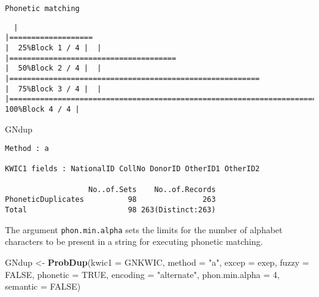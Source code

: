 \documentclass[
]{article}
\newenvironment{Shaded}{\begin{snugshade}}{\end{snugshade}}
\newcommand{\DataTypeTok}[1]{\textcolor[rgb]{0.13,0.29,0.53}{#1}}
\newcommand{\DecValTok}[1]{\textcolor[rgb]{0.00,0.00,0.81}{#1}}
\newcommand{\KeywordTok}[1]{\textcolor[rgb]{0.13,0.29,0.53}{\textbf{#1}}}
\newcommand{\NormalTok}[1]{#1}
\newcommand{\OtherTok}[1]{\textcolor[rgb]{0.56,0.35,0.01}{#1}}
\newcommand{\StringTok}[1]{\textcolor[rgb]{0.31,0.60,0.02}{#1}}
\begin{document}
\begin{verbatim}
Phonetic matching
\end{verbatim}

\begin{verbatim}
  |                                                                                    |===================                                                         |  25%Block 1 / 4 |  |                                                                                    |======================================                                      |  50%Block 2 / 4 |  |                                                                                    |=========================================================                   |  75%Block 3 / 4 |  |                                                                                    |============================================================================| 100%Block 4 / 4 |
\end{verbatim}

\begin{Shaded}
\begin{Highlighting}[]
\NormalTok{GNdup}
\end{Highlighting}
\end{Shaded}

\begin{verbatim}
Method : a

KWIC1 fields : NationalID CollNo DonorID OtherID1 OtherID2
 
                   No..of.Sets    No..of.Records
PhoneticDuplicates          98               263
Total                       98 263(Distinct:263)
\end{verbatim}

The argument \texttt{phon.min.alpha} sets the limits for the number of
alphabet characters to be present in a string for executing phonetic
matching.

\begin{Shaded}
\begin{Highlighting}[]
\NormalTok{GNdup <-}\StringTok{ }\KeywordTok{ProbDup}\NormalTok{(}\DataTypeTok{kwic1 =}\NormalTok{ GNKWIC, }\DataTypeTok{method =} \StringTok{"a"}\NormalTok{, }\DataTypeTok{excep =}\NormalTok{ exep, }
                 \DataTypeTok{fuzzy =} \OtherTok{FALSE}\NormalTok{,}
                 \DataTypeTok{phonetic =} \OtherTok{TRUE}\NormalTok{, }\DataTypeTok{encoding =} \StringTok{"alternate"}\NormalTok{, }\DataTypeTok{phon.min.alpha =} \DecValTok{4}\NormalTok{,}
                 \DataTypeTok{semantic =} \OtherTok{FALSE}\NormalTok{)}
\end{Highlighting}
\end{Shaded}
\end{document}
